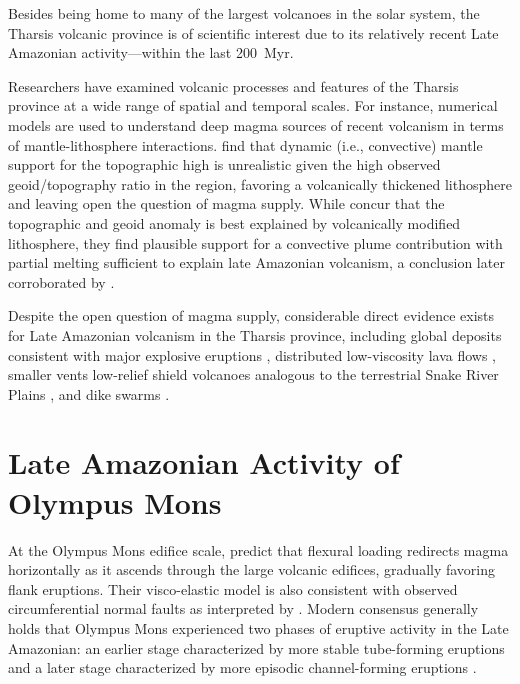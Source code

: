 Besides being home to many of the largest volcanoes in the solar system, the Tharsis volcanic province is of scientific interest due to its relatively recent Late Amazonian activity---within the last \qty{200}{Myr}.

Researchers have examined volcanic processes and features of the Tharsis province at a wide range of spatial and temporal scales. For instance, numerical models are used to understand deep magma sources of recent volcanism in terms of mantle-lithosphere interactions. \textcite{roberts_plume-induced_2004} find that dynamic (i.e., convective) mantle support for the topographic high is unrealistic given the high observed geoid/topography ratio in the region, favoring a volcanically thickened lithosphere and leaving open the question of magma supply. While \textcite{redmond_numerical_2004} concur that the topographic and geoid anomaly is best explained by volcanically modified lithosphere, they find plausible support for a convective plume contribution with partial melting sufficient to explain late Amazonian volcanism, a conclusion later corroborated by \textcite{plesa_thermal_2018}.

Despite the open question of magma supply, considerable direct evidence exists for Late Amazonian volcanism in the Tharsis province, including global deposits consistent with major explosive eruptions \parencite{hynek_explosive_2003}, distributed low-viscosity lava flows \parencite{hauber_very_2011}, smaller vents \parencite{wilson_fissure_2009,richardson_small_2021} low-relief shield volcanoes analogous to the terrestrial Snake River Plains \parencite{hauber_topography_2009}, and dike swarms \parencite{pieterek_late_2022}.

\section{Late Amazonian Activity of Olympus Mons}

At the Olympus Mons edifice scale, \textcite{mcgovern_state_1993} predict that flexural loading redirects magma horizontally as it ascends through the large volcanic edifices, gradually favoring flank eruptions. Their visco-elastic model is also consistent with observed circumferential normal faults as interpreted by \textcite{thomas_flank_1990}. Modern consensus generally holds that Olympus Mons experienced two phases of eruptive activity in the Late Amazonian: an earlier stage characterized by more stable tube-forming eruptions and a later stage characterized by more episodic channel-forming eruptions \parencite{bleacher_olympus_2007,peters_flank_2017}.

